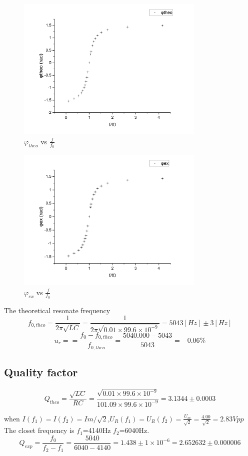 \documentclass[12pt,a4paper]{article}
\begin{document}
\begin{figure}[H]
    \centering
    \includegraphics[width=9cm]{phitheo.png}
    \caption{$\varphi_{theo}$ vs $\frac{f}{f_0}$}
\end{figure}

\begin{figure}[H]
    \centering
    \includegraphics[width=9cm]{phiex.png}
    \caption{$\varphi_{ex}$ vs $\frac{f}{f_0}$}
\end{figure}
The theoretical resonate frequency
$$f_{0,theo}=\frac{1}{2\pi\sqrt{LC}}=\frac{1}{2\pi\sqrt{0.01\times99.6\times{10}^{-9}}}=5043[Hz]\pm 3[Hz]$$
$$u_r==\frac{f_0-f_{0,theo}}{f_{0,theo}}=\frac{5040.000-5043}{5043}=-0.06\%$$

\subsection{Quality factor}
$$Q_{theo}=\frac{\sqrt{LC}}{RC}=\frac{\sqrt{0.01\times99.6\times{10}^{-9}}}{101.09\times99.6\times{10}^{-9}}=3.1344\pm 0.0003$$

when $I(f_1) = I(f_2) = Im/\sqrt{2}$,$U_R(f_1)=U_R(f_2)=\frac{U_m}{\sqrt{2}}=\frac{4.00}{\sqrt{2}}=2.83Vpp$
The closet frequency is $f_1$=4140Hz $f_2$=6040Hz. 
$$Q_{exp}=\frac{f_0}{f_2-f_1}=\frac{5040}{6040-4140}=1.438\pm1\times{10}^{-6}=2.652632\pm 0.000006$$
\end{document}
